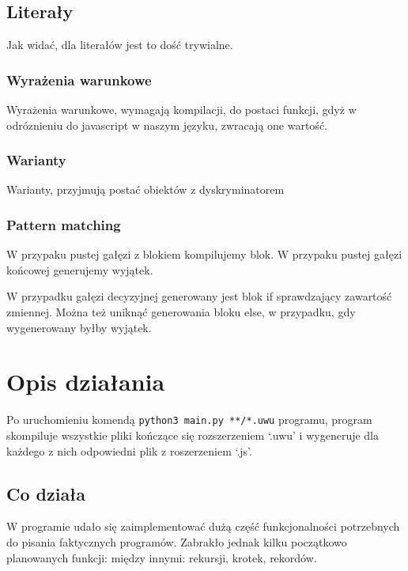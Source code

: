 \documentclass{article}
\begin{document}
\subsection{Literały}
Jak widać, dla literałów jest to dość trywialne.


\subsubsection{Wyrażenia warunkowe}
Wyrażenia warunkowe, wymagają kompilacji, do postaci funkcji, gdyż w odróznieniu do javascript w naszym języku, zwracają one wartość.


\subsubsection{Warianty}
Warianty, przyjmują postać obiektów z dyskryminatorem


\subsubsection{Pattern matching}
W przypaku pustej gałęzi z blokiem kompilujemy blok.
W przypaku pustej gałęzi końcowej generujemy wyjątek.


W przypadku gałęzi decyzyjnej generowany jest blok if sprawdzający zawartość zmiennej. Można też uniknąć generowania bloku else, w przypadku, gdy wygenerowany byłby wyjątek.\newpage


\section{Opis działania}
Po uruchomieniu komendą \lstinline{python3 main.py **/*.uwu} programu, program skompiluje wszystkie pliki kończące się rozszerzeniem `.uwu' i wygeneruje dla każdego z nich odpowiedni plik z roszerzeniem `.js'.

\subsection{Co działa}
W programie udało się zaimplementować dużą część funkcjonalności potrzebnych do pisania faktycznych programów. Zabrakło jednak kilku początkowo planowanych funkcji: między innymi: rekursji, krotek, rekordów.
\end{document}
